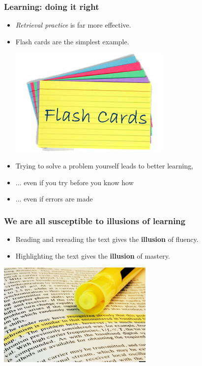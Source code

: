 \documentclass{beamer}
\newcommand{\bi}{\begin{itemize}}
\newcommand{\li}{\item}
\newcommand{\ei}{\end{itemize}}
\newcommand{\bfr}[1]{\begin{frame}[fragile]\frametitle{{ #1 }}}
\begin{document}
\bfr{Learning: doing it right}
\bi
\li {\em Retrieval practice} is far more effective.
\li Flash cards are the simplest example.
\centerline{\includegraphics[scale=1.0]{flashcards.jpg}}
\li Trying to solve a problem yourself
leads to better learning,

\li ... even if you try before you know how
\li ... even if errors are made

\ei


\end{frame}



\bfr{We are all susceptible to {\bf illusions} of learning}
\bi
\li Reading and rereading 
the text gives the {\bf illusion} of fluency.
\li Highlighting 
the text gives the {\bf illusion} of mastery.
\ei
\centerline{\includegraphics[width=3in]{highlighting.jpg}}
\end{frame}
\end{document}
